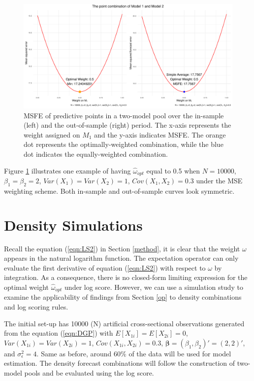 \documentclass{monashthesis}
\begin{document}
\begin{figure}[ht]
\centering
\includegraphics[scale=0.6]{figures/MSFE.pdf}
\caption{MSFE of predictive points in a two-model pool over the in-sample (left) and the out-of-sample (right) period. The x-axis represents the weight assigned on $M_1$ and the y-axis indicates MSFE. The orange dot represents the optimally-weighted combination, while the blue dot indicates the equally-weighted combination.}
\label{fig:msfe}
\end{figure}

Figure \ref{fig:msfe} illustrates one example of having \(\hat\omega_{opt}\) equal to 0.5 when \(N = 10000\), \(\beta_1=\beta_2=2\), \(Var(X_1)=Var(X_2)=1\), \(Cov(X_1,X_2)=0.3\) under the MSE weighting scheme. Both in-sample and out-of-sample curves look symmetric.

\hypertarget{density-simulations}{%
\section{Density Simulations}\label{density-simulations}}

Recall the equation (\ref{eqn:LS2}) in Section \ref{method}, it is clear that the weight \(\omega\) appears in the natural logarithm function. The expectation operator can only evaluate the first derivative of equation (\ref{eqn:LS2}) with respect to \(\omega\) by integration. As a consequence, there is no closed-form limiting expression for the optimal weight \(\hat\omega_{opt}\) under log score. However, we can use a simulation study to examine the applicability of findings from Section \ref{op} to density combinations and log scoring rules.

The initial set-up has 10000 (N) artificial cross-sectional observations generated from the equation (\ref{eqn:DGP}) with \(E[X_{1i}] = E[X_{2i}] = 0\), \(Var(X_{1i}) = Var(X_{2i}) = 1\), \(Cov(X_{1i}, X_{2i}) = 0.3\), \(\pmb{\beta} = (\beta_1, \beta_2)' = (2,2)'\), and \(\sigma^2_{\epsilon}=4\). Same as before, around 60\% of the data will be used for model estimation. The density forecast combinations will follow the construction of two-model pools and be evaluated using the log score.
\end{document}
